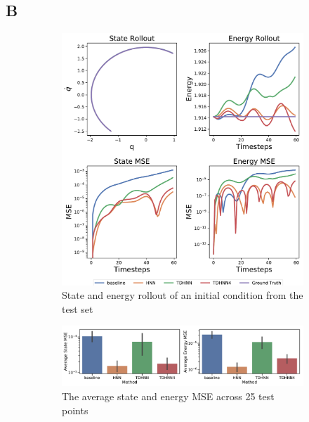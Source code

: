 \documentclass[twoside]{article}
\begin{document}
\pagebreak
\twocolumn
\subsection*{B}

\begin{figure}[!htb]
\centering
\captionsetup{justification=centering}
\begin{subfigure}[b]{0.48\textwidth}
\includegraphics[width=\textwidth]{figures/figures/mass_spring/1/mass_spring_long_0.pdf}
\caption{State and energy rollout of an initial condition from the test set}
\end{subfigure}
\begin{subfigure}[b]{0.48\textwidth}
\includegraphics[width=\textwidth]{figures/figures/mass_spring/1/mass_spring_errors_0.pdf}
\caption{The average state and energy MSE across 25 test points}
\end{subfigure}
\begin{subfigure}[b]{0.48\textwidth}

\end{subfigure}
\end{figure}
\end{document}
